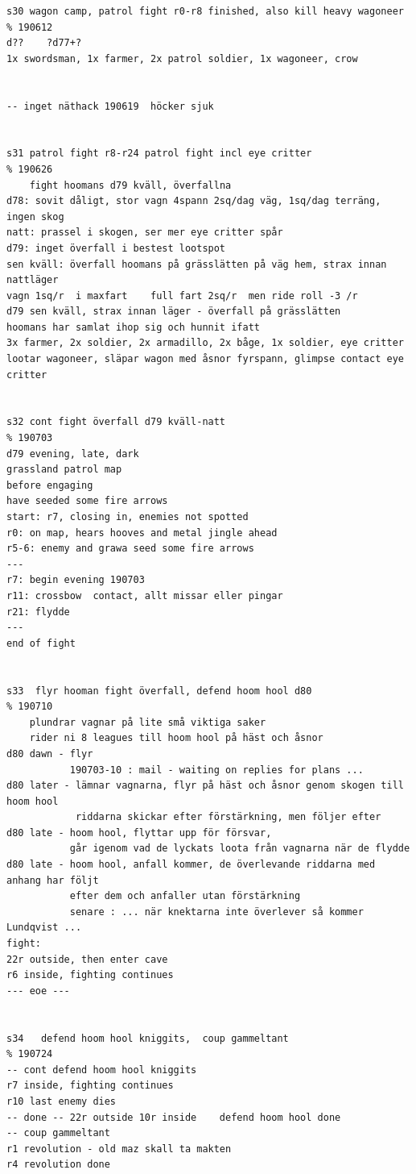 \begin{verbatim}
s30 wagon camp, patrol fight r0-r8 finished, also kill heavy wagoneer   % 190612
d??    ?d77+?
1x swordsman, 1x farmer, 2x patrol soldier, 1x wagoneer, crow


-- inget näthack 190619  höcker sjuk


s31 patrol fight r8-r24 patrol fight incl eye critter                   % 190626
    fight hoomans d79 kväll, överfallna
d78: sovit dåligt, stor vagn 4spann 2sq/dag väg, 1sq/dag terräng, ingen skog
natt: prassel i skogen, ser mer eye critter spår
d79: inget överfall i bestest lootspot
sen kväll: överfall hoomans på grässlätten på väg hem, strax innan nattläger
vagn 1sq/r  i maxfart    full fart 2sq/r  men ride roll -3 /r
d79 sen kväll, strax innan läger - överfall på grässlätten
hoomans har samlat ihop sig och hunnit ifatt
3x farmer, 2x soldier, 2x armadillo, 2x båge, 1x soldier, eye critter
lootar wagoneer, släpar wagon med åsnor fyrspann, glimpse contact eye critter


s32 cont fight överfall d79 kväll-natt                                  % 190703
d79 evening, late, dark
grassland patrol map
before engaging
have seeded some fire arrows
start: r7, closing in, enemies not spotted
r0: on map, hears hooves and metal jingle ahead
r5-6: enemy and grawa seed some fire arrows
---
r7: begin evening 190703
r11: crossbow  contact, allt missar eller pingar
r21: flydde
--- 
end of fight


s33  flyr hooman fight överfall, defend hoom hool d80                   % 190710
    plundrar vagnar på lite små viktiga saker
    rider ni 8 leagues till hoom hool på häst och åsnor
d80 dawn - flyr
           190703-10 : mail - waiting on replies for plans ...
d80 later - lämnar vagnarna, flyr på häst och åsnor genom skogen till hoom hool
            riddarna skickar efter förstärkning, men följer efter
d80 late - hoom hool, flyttar upp för försvar,
           går igenom vad de lyckats loota från vagnarna när de flydde
d80 late - hoom hool, anfall kommer, de överlevande riddarna med anhang har följt
           efter dem och anfaller utan förstärkning
           senare : ... när knektarna inte överlever så kommer Lundqvist ...
fight:
22r outside, then enter cave
r6 inside, fighting continues
--- eoe ---


s34   defend hoom hool kniggits,  coup gammeltant                       % 190724
-- cont defend hoom hool kniggits
r7 inside, fighting continues
r10 last enemy dies
-- done -- 22r outside 10r inside    defend hoom hool done
-- coup gammeltant
r1 revolution - old maz skall ta makten
r4 revolution done



\end{verbatim}
